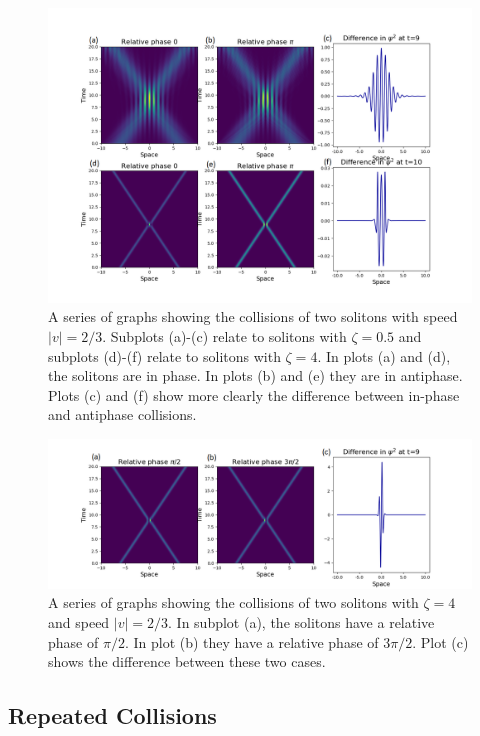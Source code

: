 \documentclass[10pt, twocolumn]{revtex4}    %
\begin{document}
\begin{figure}
\includegraphics[width=\textwidth]{extensionpic.png}
\caption{A series of graphs showing the collisions of two solitons with speed $|v|=2/3$. Subplots (a)-(c) relate to solitons with $\zeta=0.5$ and subplots (d)-(f) relate to solitons with $\zeta=4$. In plots (a) and (d), the solitons are in phase. In plots (b) and (e) they are in antiphase. Plots (c) and (f) show more clearly the difference between in-phase and antiphase collisions.}
\label{collision}
\end{figure}

\begin{figure}
\includegraphics[width=\textwidth]{asymmetrical_collision.png}
\caption{A series of graphs showing the collisions of two solitons with $\zeta=4$ and speed $|v|=2/3$. In subplot (a), the solitons have a relative phase of $\pi/2$. In plot (b) they have a relative phase of $3\pi/2$. Plot (c) shows the difference between these two cases.}
\label{asymmetric}
\end{figure}

\subsection{Repeated Collisions}
\end{document}

